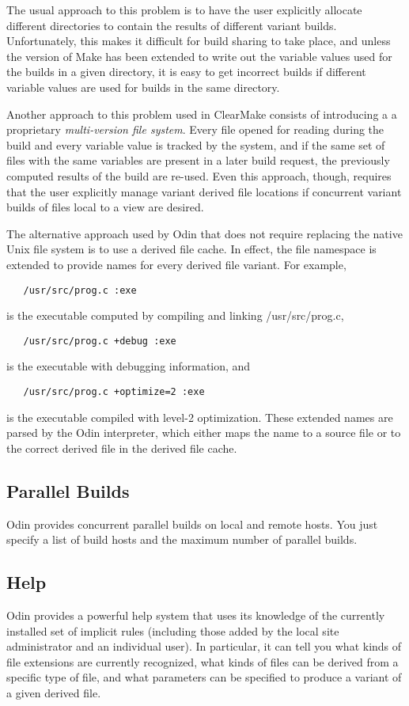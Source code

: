 The usual approach to this problem is to have the user explicitly
allocate different directories to contain the results of
different variant builds.
Unfortunately, this makes it difficult for build sharing to take place,
and unless the version of Make has been extended to write out
the variable values used for the builds in a given directory,
it is easy to get incorrect builds if different variable values are
used for builds in the same directory.

Another approach to this problem used in
ClearMake\cite{ClearCase} consists of introducing a
a proprietary {\em multi-version file system}.
Every file opened for reading during the build and every variable value
is tracked by the system, and if the same set of files with the same
variables are present in a later build request,
the previously computed results of the build are re-used.
Even this approach, though,
requires that the user explicitly manage variant derived file locations
if concurrent variant builds of files local to a view are desired.

The alternative approach used by Odin
that does not require replacing the native Unix file system
is to use a derived file cache.
In effect, the file namespace is extended to provide names for
every derived file variant.
For example,
\begin{verbatim}
   /usr/src/prog.c :exe
\end{verbatim}
is the executable computed by compiling and linking {\ex /usr/src/prog.c},
\begin{verbatim}
   /usr/src/prog.c +debug :exe
\end{verbatim}
is the executable with debugging information, and
\begin{verbatim}
   /usr/src/prog.c +optimize=2 :exe
\end{verbatim}
is the executable compiled with level-2 optimization.
These extended names are parsed by the Odin interpreter,
which either maps the name to a source file
or to the correct derived file in the derived file cache.

\subsection{Parallel Builds}
Odin provides concurrent parallel builds on local and remote hosts.
You just specify a list of build hosts and the maximum number of parallel
builds.

\subsection{Help}
Odin provides a powerful help system that uses its knowledge of the
currently installed set of implicit rules (including those added by
the local site administrator and an individual user).
In particular, it can tell you what kinds of
file extensions are currently recognized,
what kinds of files can be derived from a specific type of file,
and what parameters can be specified to produce a variant of a
given derived file.

